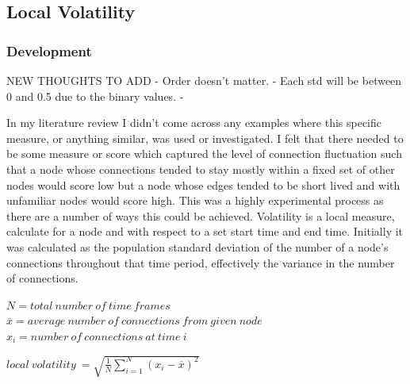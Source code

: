 



\subsection{Local Volatility}

\subsubsection{Development}

NEW THOUGHTS TO ADD
- Order doesn't matter.
- Each std will be between 0 and 0.5 due to the binary values.
- 

In my literature review I didn’t come across any examples where this specific measure, or anything similar, was used or investigated. I felt that there needed to be some measure or score which captured the level of connection fluctuation such that a node whose connections tended to stay mostly within a fixed set of other nodes would score low but a node whose edges tended to be short lived and with unfamiliar nodes would score high. This was a highly experimental process as there are a number of ways this could be achieved.
Volatility is a local measure, calculate for a node and with respect to a set start time and end time. Initially it was calculated as the population standard deviation of the number of a node’s connections throughout that time period, effectively the variance in the number of connections.

\begin{center}
$N = total\ number\ of\ time\ frames$
$\overline{x} = average\ number\ of\ connections\ from\ given\ node $
$x_i = number\ of\ connections\ at\ time\ i$

$local\ volatility\ = \sqrt{\frac{1}{N} \sum_{i=1}^N (x_i - \overline{x})^2}$
\end{center}

